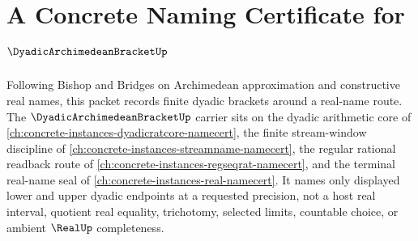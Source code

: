 \chapter{A Concrete Naming Certificate for $\DyadicArchimedeanBracketUp$}
\label{ch:concrete-instances-dyadic-archimedean-bracket-namecert}

Following Bishop and Bridges on Archimedean approximation and constructive real names, this packet records finite dyadic brackets around a real-name route. The $\DyadicArchimedeanBracketUp$ carrier sits on the dyadic arithmetic core of \autoref{ch:concrete-instances-dyadicratcore-namecert}, the finite stream-window discipline of \autoref{ch:concrete-instances-streamname-namecert}, the regular rational readback route of \autoref{ch:concrete-instances-regseqrat-namecert}, and the terminal real-name seal of \autoref{ch:concrete-instances-real-namecert}. It names only displayed lower and upper dyadic endpoints at a requested precision, not a host real interval, quotient real equality, trichotomy, selected limits, countable choice, or ambient $\RealUp$ completeness.

